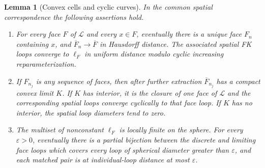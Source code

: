 \documentclass[11pt]{article}
\numberwithin{equation}{section}
\newtheorem{lemma}[theorem]{Lemma}
\theoremstyle{definition}
\theoremstyle{remark}
\newcommand{\1}{\mathbf 1}
\begin{document}
\begin{lemma}[Convex cells and cyclic curves]\label{loop:convex}
In the common spatial correspondence the following assertions hold.
\begin{enumerate}
\item For every face $F$ of $\mathcal L$ and every $x\in F$, eventually
there is a unique face $F_n$ containing $x$, and
$\overline F_n\to\overline F$ in Hausdorff distance.  The associated
spatial FK loops converge to $\ell_F$ in uniform distance modulo cyclic
increasing reparameterization.
\item If $F_{n_j}$ is any sequence of faces, then after further extraction
$\overline F_{n_j}$ has a compact convex limit $K$.  If $K$ has interior,
it is the closure of one face of $\mathcal L$ and the corresponding
spatial loops converge cyclically to that face loop.  If $K$ has no
interior, the spatial loop diameters tend to zero.
\item The multiset of nonconstant $\ell_F$ is locally finite on the sphere.
For every $\varepsilon>0$, eventually there is a partial bijection between
the discrete and limiting face loops which covers every loop of spherical
diameter greater than $\varepsilon$, and each matched pair is at
individual-loop distance at most $\varepsilon$.
\end{enumerate}
\end{lemma}
\end{document}
